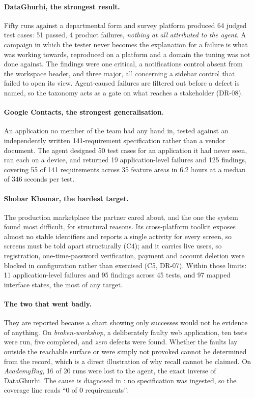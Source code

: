 \paragraph{DataGhurhi, the strongest result.} Fifty runs against a departmental
form and survey platform produced 64 judged test cases: 51 passed, 4 product
failures, \emph{nothing at all attributed to the agent}. A campaign in which
the tester never becomes the explanation for a failure is what
 was working towards, reproduced on a platform and a domain
the tuning was not done against. The findings were one critical, a
notifications control absent from the workspace header, and three major, all
concerning a sidebar control that failed to open its view. Agent-caused
failures are filtered out before a defect is named, so the taxonomy acts as a
gate on what reaches a stakeholder (DR-08).

\paragraph{Google Contacts, the strongest generalisation.} An application no
member of the team had any hand in, tested against an independently written
141-requirement specification rather than a vendor document. The agent designed
50 test cases for an application it had never seen, ran each on a device, and
returned 19 application-level failures and 125 findings, covering 55 of 141
requirements across 35 feature areas in 6.2 hours at a median of 346 seconds
per test.

\paragraph{Shobar Khamar, the hardest target.} The production marketplace the partner
cared about, and the one the system found most difficult, for structural
reasons. Its cross-platform toolkit exposes almost no stable identifiers and
reports a single activity for every screen, so screens must be told apart
structurally (C4); and it carries live users, so registration, one-time-password
verification, payment and account deletion were blocked in configuration rather
than exercised (C5, DR-07). Within those limits: 11 application-level failures
and 95 findings across 45 tests, and 97 mapped interface states, the most of any
target.

\paragraph{The two that went badly.} They are reported because a chart showing
only successes would not be evidence of anything. On \emph{broken-workshop}, a
deliberately faulty web application, ten tests were run, five completed, and
\emph{zero} defects were found. Whether the faults lay outside the reachable
surface or were simply not provoked cannot be determined from the record, which
is a direct illustration of why recall cannot be claimed. On \emph{AcademyBug},
16 of 20 runs were lost to the agent, the exact inverse of DataGhurhi. The
cause is diagnosed in : no specification was ingested, so
the coverage line reads ``0 of 0 requirements''.

